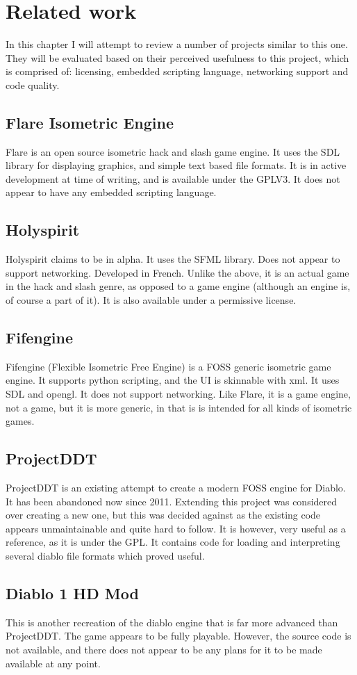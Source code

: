 \chapter{Related work}
In this chapter I will attempt to review a number of projects similar to this one. They will be evaluated based on their perceived usefulness to this project, which is comprised of: licensing, embedded scripting language, networking support and code quality.

    	\section{Flare Isometric Engine}
    	Flare\cite{flare} is an open source isometric hack and slash game engine. It uses the SDL library for displaying graphics, and simple text based file formats. It is in active development at time of writing, and is available under the GPLV3.
    	It does not appear to have any embedded scripting language.
    	
    	\section{Holyspirit}
    	Holyspirit\cite{holyspirit} claims to be in alpha. It uses the SFML library. Does not appear to support networking.
    	Developed in French. Unlike the above, it is an actual game in the hack and slash genre, as opposed to a game engine (although an engine is, of course a part of it). It is also available under a permissive license.
    	
    	\section{Fifengine}
    	Fifengine\cite{fife} (Flexible Isometric Free Engine) is a FOSS generic isometric game engine.
    	It supports python scripting, and the UI is skinnable with xml.
    	It uses SDL and opengl. It does not support networking.
    	Like Flare, it is a game engine, not a game, but it is more generic, in that is is intended for all kinds of isometric games.
    	
    	\section{ProjectDDT}
    	ProjectDDT\cite{ddt} is an existing attempt to create a modern FOSS engine for Diablo.
    	It has been abandoned now since 2011.
    	Extending this project was considered over creating a new one, but this was decided against as the existing code appears unmaintainable and quite hard to follow.
    	It is however, very useful as a reference, as it is under the GPL.
    	It contains code for loading and interpreting several diablo file formats which proved useful.
    	
    	\section{Diablo 1 HD Mod}
    	This\cite{d1hd} is another recreation of the diablo engine that is far more advanced than ProjectDDT. The game appears to be fully playable. However, the source code is not available, and there does not appear to be any plans for it to be made available at any point.
